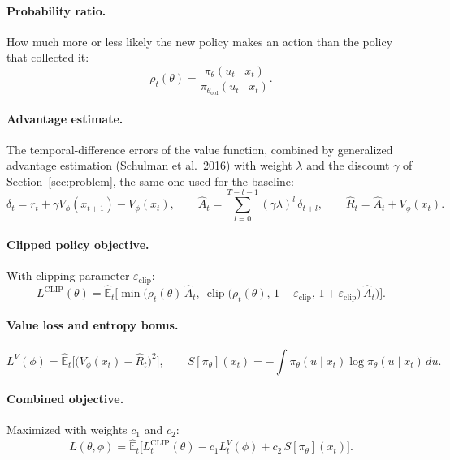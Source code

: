 \documentclass[11pt]{article}
\begin{document}
\paragraph{Probability ratio.} How much more or less likely the new policy makes an action than the
policy that collected it:
\[
  \rho_t(\theta) = \frac{\pi_\theta(u_t \mid x_t)}{\pi_{\theta_{\mathrm{old}}}(u_t \mid x_t)} .
\]

\paragraph{Advantage estimate.} The temporal-difference errors of the value function, combined by
generalized advantage estimation (Schulman et al.\ 2016) with weight $\lambda$ and the discount
$\gamma$ of Section~\ref{sec:problem}, the same one used for the baseline:
\[
  \delta_t = r_t + \gamma V_\phi(x_{t+1}) - V_\phi(x_t), \qquad
  \hat A_t = \sum_{l=0}^{T - t - 1} (\gamma \lambda)^l\, \delta_{t+l}, \qquad
  \hat R_t = \hat A_t + V_\phi(x_t) .
\]

\paragraph{Clipped policy objective.} With clipping parameter $\varepsilon_{\mathrm{clip}}$:
\[
  L^{\mathrm{CLIP}}(\theta) = \hat{\mathbb{E}}_t\Big[\min\big(\rho_t(\theta)\, \hat A_t,\
  \operatorname{clip}\big(\rho_t(\theta),\, 1 - \varepsilon_{\mathrm{clip}},\,
  1 + \varepsilon_{\mathrm{clip}}\big)\, \hat A_t\big)\Big].
\]

\paragraph{Value loss and entropy bonus.}
\[
  L^{V}(\phi) = \hat{\mathbb{E}}_t\Big[\big(V_\phi(x_t) - \hat R_t\big)^2\Big], \qquad
  S[\pi_\theta](x_t) = -\int \pi_\theta(u \mid x_t) \log \pi_\theta(u \mid x_t)\, du .
\]

\paragraph{Combined objective.} Maximized with weights $c_1$ and $c_2$:
\[
  L(\theta, \phi) = \hat{\mathbb{E}}_t\Big[ L^{\mathrm{CLIP}}_t(\theta) - c_1 L^{V}_t(\phi)
  + c_2\, S[\pi_\theta](x_t) \Big].
\]
\end{document}

